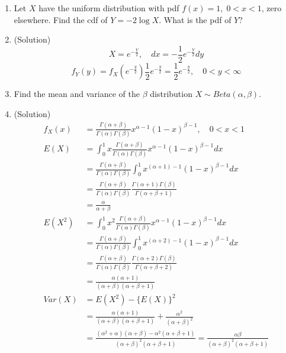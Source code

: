\documentclass{oblivoir}
\begin{document}
\begin{enumerate}
\item
Let $X$ have the uniform distribution with pdf $f(x) = 1, \; 0<x<1$, zero elsewhere.
Find the cdf of $Y = -2 \log X$. What is the pdf of $Y$?
\item[] (Solution)
$$
X = e^{-\frac{Y}{2}}, \quad dx = - \frac{1}{2}e^{-\frac{Y}{2}} dy
$$
$$
f_Y(y) = f_X(e^{-\frac{y}{2}}) \frac{1}{2} e^{-\frac{y}{2}} = \frac{1}{2} e^{-\frac{y}{2}}, \quad 0 < y < \infty
$$

\item
Find the mean and variance of the $\beta$ distribution $X \sim Beta(\alpha, \beta)$.

\item[] (Solution)
\begin{align*}
f_X(x) &= \frac{\Gamma(\alpha + \beta)}{\Gamma(\alpha) \Gamma(\beta)} x^{\alpha - 1} (1-x)^{\beta-1}, \quad 0 < x < 1\\
E(X) &= \int_0^1 x \frac{\Gamma(\alpha + \beta)}{\Gamma(\alpha) \Gamma(\beta)} x^{\alpha - 1} (1-x)^{\beta-1} dx \\
&= \frac{\Gamma(\alpha + \beta)}{\Gamma(\alpha) \Gamma(\beta)} \int_0^1 x^{(\alpha + 1) - 1} (1-x)^{\beta-1} dx \\
&= \frac{\Gamma(\alpha + \beta)}{\Gamma(\alpha) \Gamma(\beta)} \frac{\Gamma(\alpha + 1) \Gamma(\beta)}{\Gamma(\alpha + \beta + 1)} \\
&= \frac{\alpha}{\alpha + \beta} \\
E(X^2) &= \int_0^1 x^2 \frac{\Gamma(\alpha + \beta)}{\Gamma(\alpha) \Gamma(\beta)} x^{\alpha - 1} (1-x)^{\beta-1} dx \\
&= \frac{\Gamma(\alpha + \beta)}{\Gamma(\alpha) \Gamma(\beta)} \int_0^1 x^{(\alpha + 2) - 1} (1-x)^{\beta-1} dx \\
&= \frac{\Gamma(\alpha + \beta)}{\Gamma(\alpha) \Gamma(\beta)} \frac{\Gamma(\alpha + 2) \Gamma(\beta)}{\Gamma(\alpha + \beta + 2)} \\
&= \frac{\alpha(\alpha+1)}{(\alpha + \beta)(\alpha + \beta + 1)} \\
Var(X) &= E(X^2) - \{ E(X) \}^2 \\
&= \frac{\alpha(\alpha+1)}{(\alpha + \beta)(\alpha + \beta + 1)} + \frac{\alpha^2}{(\alpha + \beta)^2} \\
&= \frac{(\alpha^2 + \alpha)(\alpha + \beta) - \alpha^2 (\alpha + \beta + 1)}{(\alpha + \beta)^2(\alpha + \beta + 1)} = \frac{\alpha\beta}{(\alpha + \beta)^2(\alpha + \beta + 1)}\\
\end{align*}


\end{enumerate}
\end{document}
